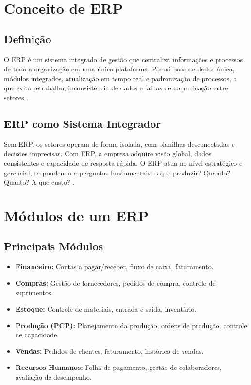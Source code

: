 \documentclass[12pt,a4paper,oneside]{article}
\begin{document}
\section{Conceito de ERP}

\subsection{Definição}

O ERP é um sistema integrado de gestão que centraliza informações e processos de toda a organização em uma única plataforma. Possui base de dados única, módulos integrados, atualização em tempo real e padronização de processos, o que evita retrabalho, inconsistência de dados e falhas de comunicação entre setores \cite{santos2024}.

\subsection{ERP como Sistema Integrador}

Sem ERP, os setores operam de forma isolada, com planilhas desconectadas e decisões imprecisas. Com ERP, a empresa adquire visão global, dados consistentes e capacidade de resposta rápida. O ERP atua no nível estratégico e gerencial, respondendo a perguntas fundamentais: o que produzir? Quando? Quanto? A que custo? \cite{groover2011}.

\section{Módulos de um ERP}

\subsection{Principais Módulos}

\begin{itemize}
  \item \textbf{Financeiro:} Contas a pagar/receber, fluxo de caixa, faturamento.
  \item \textbf{Compras:} Gestão de fornecedores, pedidos de compra, controle de suprimentos.
  \item \textbf{Estoque:} Controle de materiais, entrada e saída, inventário.
  \item \textbf{Produção (PCP):} Planejamento da produção, ordens de produção, controle de capacidade.
  \item \textbf{Vendas:} Pedidos de clientes, faturamento, histórico de vendas.
  \item \textbf{Recursos Humanos:} Folha de pagamento, gestão de colaboradores, avaliação de desempenho.
\end{itemize}
\end{document}
